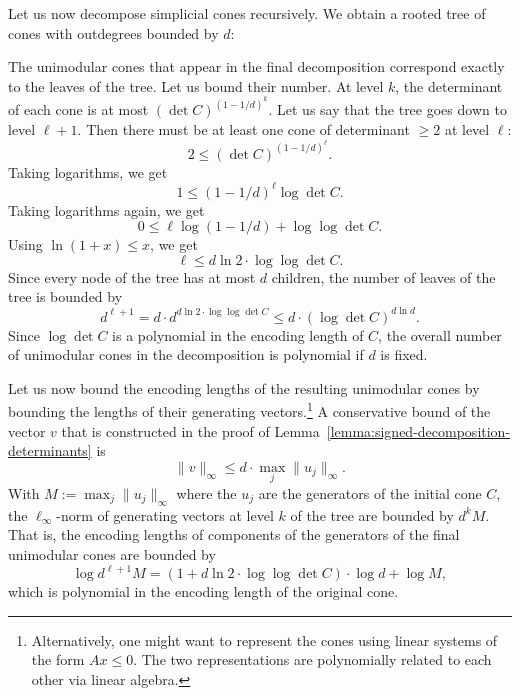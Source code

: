Let us now decompose simplicial cones recursively.
We obtain a rooted tree of cones
with outdegrees bounded by $d$:
\begin{center}
\end{center}
The unimodular cones that appear in the final decomposition correspond exactly to the leaves of the tree.
Let us bound their number.
At level $k$, the determinant of each cone is at most $(\det C)^{(1-1/d)^k}$.
Let us say that the tree goes down to level $\ell + 1$.
Then there must be at least one cone of determinant $\geq 2$ at level $\ell$:
\[
  2 \leq (\det C)^{(1 - 1/d)^\ell}.
\]
Taking logarithms, we get
\[
  1 \leq (1 - 1/d)^\ell \log\det C.
\]
Taking logarithms again, we get
\[
  0 \leq \ell \log(1 - 1/d) + \log\log\det C.
\]
Using $\ln(1 + x) \leq x$, we get
\[
  \ell \leq d \ln 2 \cdot \log\log\det C.
\]
Since every node of the tree has at most $d$ children,
the number of leaves of the tree is bounded by
\[
  d^{\ell + 1} = d \cdot d^{d \ln 2 \cdot \log\log\det C} \leq d \cdot (\log\det C)^{d \ln d}.
\]
Since $\log\det C$ is a polynomial in the encoding length of $C$,
the overall number of unimodular cones in the decomposition is polynomial if $d$ is fixed.

Let us now bound the encoding lengths of the resulting unimodular cones
by bounding the lengths of their generating vectors.\footnote{%
Alternatively, one might want to represent the cones using linear systems of the form $Ax \leq 0$.
The two representations are polynomially related to each other via linear algebra.}
A conservative bound of the vector $v$ that is constructed in the proof of Lemma~\ref{lemma:signed-decomposition-determinants} is
\[
  \|v\|_\infty \leq d\cdot \max_j \|u_j\|_\infty.
\]
With $M := \max_j \|u_j\|_\infty$ where the $u_j$ are the generators of the initial cone $C$,
the $\ell_\infty$-norm of generating vectors at level $k$ of the tree are bounded by $d^k M$.
That is, the encoding lengths of components of the generators of the final unimodular cones are bounded by
\[
  \log d^{\ell + 1} M = (1 + d \ln 2 \cdot \log\log\det C) \cdot \log d + \log M,
\]
which is polynomial in the encoding length of the original cone.

